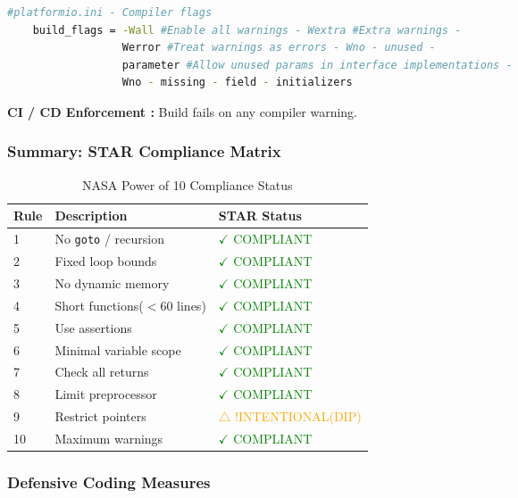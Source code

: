 \begin{lstlisting}[language = bash]
#platformio.ini - Compiler flags
    build_flags = -Wall #Enable all warnings - Wextra #Extra warnings -
                  Werror #Treat warnings as errors - Wno - unused -
                  parameter #Allow unused params in interface implementations -
                  Wno - missing - field - initializers
\end{lstlisting}

\textbf{CI / CD Enforcement :} Build fails on any compiler warning.

\subsubsection{Summary:
  STAR Compliance Matrix
}

\begin{table}[H]
\centering
\caption{NASA Power of 10 Compliance Status}
\label{tab:nasa-compliance}
\begin{tabular} { | p{1cm} | p{7cm} | p{4cm} |}
\hline
\textbf{Rule} & \textbf{Description} & \textbf{STAR Status}
\\
\hline 1 & No \texttt{goto} / recursion & \textcolor{green} {
  $\checkmark$ COMPLIANT
}
\\
\hline 2 & Fixed loop bounds & \textcolor{green} { $\checkmark$ COMPLIANT}
\\
\hline 3 & No dynamic memory & \textcolor{green} { $\checkmark$ COMPLIANT}
\\
\hline 4 & Short functions($ < $60 lines) & \textcolor{green} {
  $\checkmark$ COMPLIANT
}
\\
\hline 5 & Use assertions & \textcolor{green} { $\checkmark$ COMPLIANT}
\\
\hline 6 & Minimal variable scope & \textcolor{green} {
  $\checkmark$ COMPLIANT
}
\\
\hline 7 & Check all returns & \textcolor{green} { $\checkmark$ COMPLIANT}
\\
\hline 8 & Limit preprocessor & \textcolor{green} { $\checkmark$ COMPLIANT}
\\
\hline 9 & Restrict pointers & \textcolor{orange} {
  $\triangle$ !INTENTIONAL(DIP)
}
\\
\hline 10 & Maximum warnings & \textcolor{green} { $\checkmark$ COMPLIANT}
\\
\hline
\end{tabular}
\end{table}

\subsubsection{Defensive Coding Measures}

